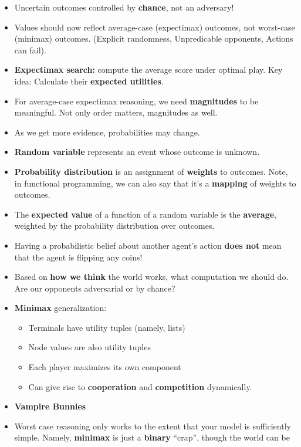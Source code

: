 \documentclass[twocolumn]{article}
\begin{document}
\begin{itemize}
\item Uncertain outcomes controlled by \textbf{chance}, not an
  adversary!
\item Values should now reflect average-case (expectimax) outcomes,
  not worst-case (minimax) outcomes. (Explicit randomness,
  Unpredicable opponents, Actions can fail).
\item \textbf{Expectimax search:} compute the average score under
  optimal play. Key idea: Calculate their \textbf{expected
    utilities}. 
\item For average-case expectimax reasoning, we need
  \textbf{magnitudes} to be meaningful. Not only order matters,
  magnitudes as well.
\item As we get more evidence, probabilities may change.
\item \textbf{Random variable} represents an event whose outcome is
  unknown.
\item \textbf{Probability distribution} is an assignment of
  \textbf{weights} to outcomes. Note, in functional programming, we
  can also say that it's a \textbf{mapping} of weights to outcomes.
\item The \textbf{expected value} of a function of a random variable
  is the \textbf{average}, weighted by the probability distribution
  over outcomes.
\item Having a probabilistic belief about another agent's action
  \textbf{does not} mean that the agent is flipping any coins!
\item Based on \textbf{how we think} the world works, what computation
  we should do. Are our opponents adversarial or by chance?
\item \textbf{Minimax} generalization:
  \begin{itemize}
  \item Terminals have utility tuples (namely, lists)
  \item Node values are also utility tuples
  \item Each player maximizes its own component
  \item Can give rise to \textbf{cooperation} and \textbf{competition}
    dynamically. 
  \end{itemize}
\item \textbf{Vampire Bunnies}
\item {\color{red} Worst case reasoning only works to the extent that
    your model is sufficiently simple.} Namely, \textbf{minimax} is
  just a \textbf{binary} ``crap'', though the world can be

\end{itemize}
\end{document}
